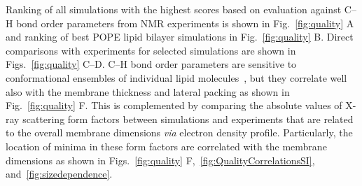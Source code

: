 \documentclass[fleqn,10pt]{wlscirep}
\begin{document}
Ranking of all simulations with the highest scores based on evaluation against C--H bond order parameters from NMR experiments is shown in Fig.~\ref{fig:quality} A and ranking of best POPE lipid bilayer simulations in Fig.~\ref{fig:quality} B. Direct comparisons with experiments for selected simulations are shown in Figs.~\ref{fig:quality} C--D. C--H bond order parameters are sensitive to conformational ensembles of individual lipid molecules~\cite{ollila16}, but they correlate well also with the membrane thickness and lateral packing as shown in Fig.~\ref{fig:quality} F. This is complemented by comparing the absolute values of X-ray scattering form factors between simulations and experiments that are related to the overall membrane dimensions \textit{via} electron density profile. Particularly, the location of minima in these form factors are correlated with the membrane dimensions as shown in Figs.~\ref{fig:quality} F,~\ref{fig:QualityCorrelationsSI}, and~\ref{fig:sizedependence}.




\end{document}
